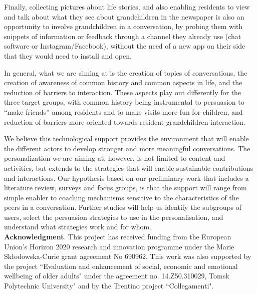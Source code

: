 \documentclass[runningheads,a4paper,oribibl]{llncs}
\begin{document}
Finally, collecting pictures about life stories, and also enabling residents to view and talk about what they see about grandchildren in the newspaper is also an opportunity to involve grandchildren in a conversation, by probing them with snippets of information or feedback through a channel they already use (chat software or Instagram/Facebook), without the need of a new app on their side that they would need to install and open.

In general, what we are aiming at is the creation of topics of conversations, the creation of awareness of common history and common aspects in life, and the reduction of barriers to interaction. These aspects play out differently for the three target groups, with common history being instrumental to persuasion to “make friends” among residents and to make visits more fun for children, and reduction of barriers more oriented towards resident-grandchildren interaction.  

We believe this technological support provides the environment that will enable the different actors to develop stronger and more meaningful conversations. The personalization we are aiming at, however, is not limited to content and activities, but extends to the strategies that will enable sustainable contributions and interactions. Our hypothesis based on our preliminary work that includes a literature review, surveys and focus groups, is that the support will range from simple enabler to coaching mechanisms sensitive to the characteristics of the peers in a conversation.  Further studies will help us identify the subgroups of users, select the persuasion strategies to use in the personalisation, and understand what strategies work and for whom. 
\\



\noindent \textbf{Acknowledgment}. This project has received funding from the European Union's Horizon 2020 research and innovation programme under the Marie Skłodowska-Curie grant agreement No 690962. This work was also supported by the project ``Evaluation and enhancement of social, economic and emotional wellbeing of older adults" under the agreement no. 14.Z50.310029, Tomsk Polytechnic University" and by the Trentino project ``Collegamenti".





\end{document}
